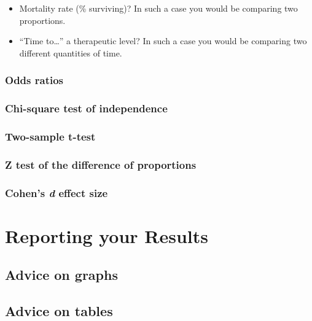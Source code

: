 \documentclass[
]{report}
\providecommand{\tightlist}{%
  \setlength{\itemsep}{0pt}\setlength{\parskip}{0pt}}
\begin{document}
\begin{itemize}
\tightlist
\item
  Mortality rate (\% surviving)? In such a case you would be comparing
  two proportions.
\item
  ``Time to\ldots{}'' a therapeutic level? In such a case you would be
  comparing two different quantities of time.
\end{itemize}

\hypertarget{odds-ratios}{%
\subsection{Odds ratios}\label{odds-ratios}}

\hypertarget{chi-square-test-of-independence}{%
\subsection{Chi-square test of
independence}\label{chi-square-test-of-independence}}

\hypertarget{two-sample-t-test}{%
\subsection{Two-sample t-test}\label{two-sample-t-test}}

\hypertarget{z-test-of-the-difference-of-proportions}{%
\subsection{Z test of the difference of
proportions}\label{z-test-of-the-difference-of-proportions}}

\hypertarget{cohens-d-effect-size}{%
\subsection{\texorpdfstring{Cohen's \emph{d} effect
size}{Cohen's d effect size}}\label{cohens-d-effect-size}}

\hypertarget{reporting-your-results}{%
\chapter{Reporting your Results}\label{reporting-your-results}}

\hypertarget{advice-on-graphs}{%
\section{Advice on graphs}\label{advice-on-graphs}}

\hypertarget{advice-on-tables}{%
\section{Advice on tables}\label{advice-on-tables}}

  
\end{document}

